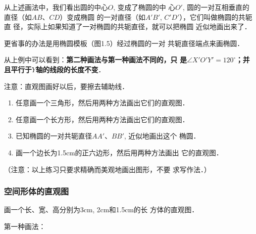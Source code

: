 \begin{example}
从上述画法中，我们看出圆的中心$O$, 变成了椭圆的中
心$O'$, 圆的一对互相垂直的直径（如$AB$、$CD$）变成椭圆
的一对直径（如$A'B'$, $C'D'$），它们叫做椭圆的共轭直
径，实际上如果知道了一对椭圆的共轭直径，就可以把椭圆
近似地画出来了．

更省事的办法是用椭圆模板（图1.5）经过椭圆的一对
共轭直径端点来画椭圆．
\begin{figure}[htp]
    \centering
{}
    \caption{}
\end{figure}

从上例中可以看到：\textbf{第二种画法与第一种画法不同的，只
是$\angle X'O'Y'=120^{\circ}$；并且平行于$Y$轴的线段的长度不变}．

注意：直观图画好以后，要擦去辅助线．
\end{example}

\begin{ex}
\begin{enumerate}
\item 任意画一个三角形，然后用两种方法画出它们的直观图．
\item 任意画一个长方形，然后用两种方法画出它们的直观图．
\item 已知椭圆的一对共轭直径$AA'$、$BB'$, 近似地画出这个
椭圆．
\item 画一个边长为1.5cm的正六边形，然后用两种方法画出
它的直观图．
\end{enumerate}

（注意：以上练习只要求精确而美观地画出图形，不要
求写作法．）
\end{ex}

\subsubsection{空间形体的直观图}
\begin{example}
    画一个长、宽、高分别为3cm, 2cm和1.5cm的长
方体的直观图．
\end{example}

第一种画法：

